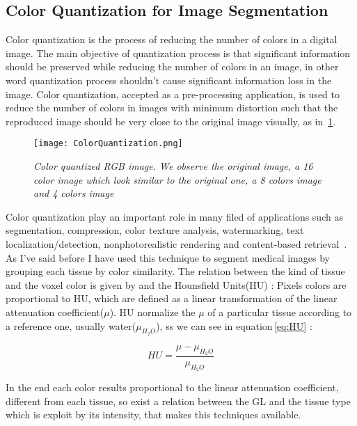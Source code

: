 \documentclass{standalone}
\begin{document}
	\subsection{Color Quantization for Image Segmentation}
	

	Color quantization is the process of reducing the number of colors in a digital image. The main objective of quantization process is that 
	significant information should be preserved while reducing the number of colors in an image, in other word quantization process shouldn’t cause 
	significant information loss in the image. 
	Color quantization, accepted as a pre-processing application, is used to reduce the number of colors in images with minimum distortion such that the 
	reproduced image should be very close to the original image visually, as in \figurename\,\ref{fig:ColorQuantization}. 

	\begin{figure}[hp]
		\label{fig:ColorQuantization}
		\centering
			\texttt{[image: ColorQuantization.png]}
		\caption{\textit{Color quantized RGB image. We observe the original image, a 16 color image which look similar to the original one, a 8 colors image and 4 colors image}}
	\end{figure}

	Color quantization play an important role in many filed of applications such as segmentation, compression, color texture analysis, watermarking, 
	text localization/detection, nonphotorealistic rendering and content-based retrieval~\cite{ART:Ozturk}.\\
	
	As I've said before I have used this technique to segment medical images by grouping each tissue by color similarity. The relation between the kind of tissue and the voxel color is given by  and the Hounsfield Units(HU) : Pixels colors are proportional to HU, which are defined as a linear transformation of the linear attenuation coefficient($\mu$). HU normalize the $\mu$ of a particular tissue according to a reference one, usually water($\mu_{H_2 O}$), ss we can see in equation\,\ref{eq:HU} : 
	
	\begin{equation}\label{eq:HU}
		HU = \frac{\mu - \mu_{H_2 O}}{\mu_{H_2 O}}
	\end{equation}
		
	In the end each color results proportional to the linear attenuation coefficient, different from each tissue, so exist a relation between the GL and the tissue type which is exploit by its intensity, that makes this techniques available. 
\end{document}
